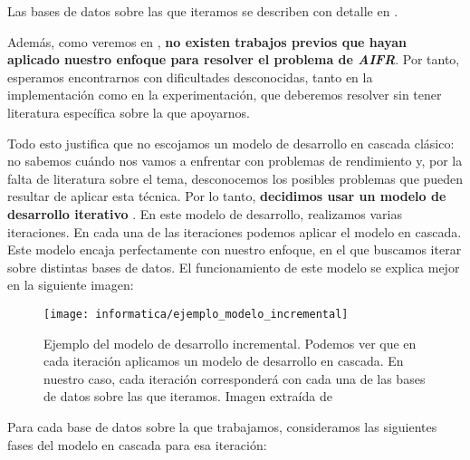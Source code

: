 Las bases de datos sobre las que iteramos se describen con detalle en .

Además, como veremos en , \textbf{no existen trabajos previos que hayan aplicado nuestro enfoque para resolver el problema de \textit{AIFR}}. Por tanto, esperamos encontrarnos con dificultades desconocidas, tanto en la implementación como en la experimentación, que deberemos resolver sin tener literatura específica sobre la que apoyarnos.

Todo esto justifica que no escojamos un modelo de desarrollo en cascada clásico: no sabemos cuándo nos vamos a enfrentar con problemas de rendimiento y, por la falta de literatura sobre el tema, desconocemos los posibles problemas que pueden resultar de aplicar esta técnica. Por lo tanto, \textbf{decidimos usar un modelo de desarrollo iterativo} \cite{informatica:libro_metodologias_desarrollo}. En este modelo de desarrollo, realizamos varias iteraciones. En cada una de las iteraciones podemos aplicar el modelo en cascada. Este modelo encaja perfectamente con nuestro enfoque, en el que buscamos iterar sobre distintas bases de datos. El funcionamiento de este modelo se explica mejor en la siguiente imagen:

\begin{figure}[H]
    \centering
    \texttt{[image: informatica/ejemplo\_modelo\_incremental]}
    \caption{Ejemplo del modelo de desarrollo incremental. Podemos ver que en cada iteración aplicamos un modelo de desarrollo en cascada. En nuestro caso, cada iteración corresponderá con cada una de las bases de datos sobre las que iteramos. Imagen extraída de \cite{informatica:libro_metodologias_desarrollo}}
\end{figure}

Para cada base de datos sobre la que trabajamos, consideramos las siguientes fases del modelo en cascada para esa iteración:

